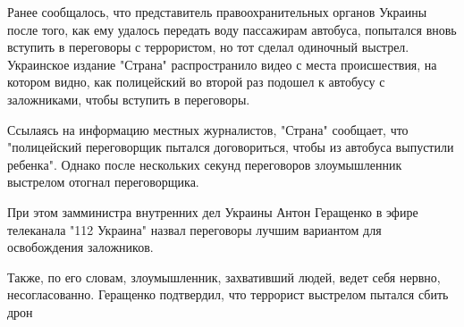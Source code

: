 Ранее сообщалось, что представитель правоохранительных органов Украины после
того, как ему удалось передать воду пассажирам автобуса, попытался вновь
вступить в переговоры с террористом, но тот сделал одиночный выстрел.
Украинское издание "Страна" распространило видео с места происшествия, на
котором видно, как полицейский во второй раз подошел к автобусу с заложниками,
чтобы вступить в переговоры.

Ссылаясь на информацию местных журналистов, "Страна" сообщает, что "полицейский
переговорщик пытался договориться, чтобы из автобуса выпустили ребенка". Однако
после нескольких секунд переговоров злоумышленник выстрелом отогнал
переговорщика.

При этом замминистра внутренних дел Украины Антон Геращенко в эфире телеканала
"112 Украина" назвал переговоры лучшим вариантом для освобождения заложников.

Также, по его словам, злоумышленник, захвативший людей, ведет себя нервно,
несогласованно.  Геращенко подтвердил, что террорист выстрелом пытался сбить
дрон

